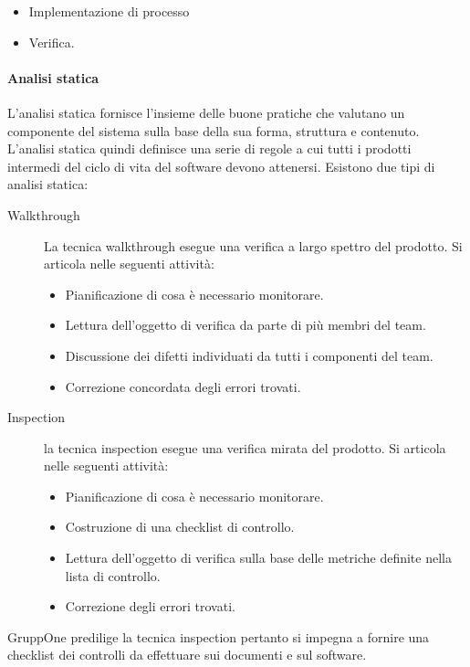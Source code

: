 \documentclass[../norme-di-progetto.tex]{subfiles}
\begin{document}
\begin{itemize}
  \item Implementazione di processo
  \item Verifica.
\end{itemize}

\paragraph{Analisi statica}%
\label{par:analisi_statica}
L'analisi statica fornisce l'insieme delle buone pratiche che valutano un componente del sistema sulla base della sua forma, struttura e contenuto. L'analisi statica quindi definisce una serie di regole  a cui tutti i prodotti intermedi del ciclo di vita del software devono attenersi. Esistono due tipi di analisi statica:
\begin{description}
  \item [Walkthrough] La tecnica walkthrough esegue una verifica a largo spettro del prodotto. Si articola nelle seguenti attività:
        \begin{itemize}
          \item Pianificazione di cosa è necessario monitorare.
          \item Lettura dell'oggetto di verifica da parte di più membri del team.
          \item Discussione dei difetti individuati da tutti i componenti del team.
          \item Correzione concordata degli errori trovati.
        \end{itemize}
  \item [Inspection] la tecnica inspection esegue una verifica mirata del prodotto. Si articola nelle seguenti attività:
        \begin{itemize}
          \item Pianificazione di cosa è necessario monitorare.
          \item Costruzione di una checklist di controllo.
          \item Lettura dell'oggetto di verifica sulla base delle metriche definite nella lista di controllo.
          \item Correzione degli errori trovati.
        \end{itemize}
\end{description}
GruppOne predilige la tecnica inspection pertanto si impegna a fornire una checklist dei controlli da effettuare sui documenti e sul software.
\end{document}
